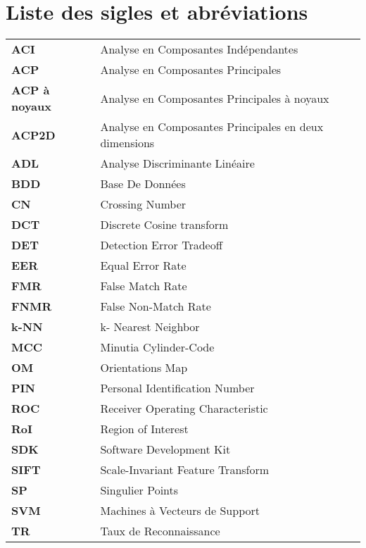 \chapter*{Liste des sigles et abréviations}%
\begin{table}[H]
	\label{my-label}
	\begin{tabular}{ll}
	    \textbf{ACI}  & Analyse en Composantes Indépendantes     \\
	    \textbf{ACP}  & Analyse en Composantes Principales     \\
	     \textbf{ACP à noyaux}  & Analyse en Composantes Principales à noyaux     \\
	    \textbf{ACP2D}  & Analyse en Composantes Principales en deux dimensions     \\
	    \textbf{ADL}  & Analyse Discriminante Linéaire     \\
	    \textbf{BDD}  & Base De Données    \\
		\textbf{CN}   & Crossing Number                          \\
	  \textbf{DCT}  & Discrete Cosine transform                 \\
		\textbf{DET}  & Detection Error Tradeoff                 \\
		\textbf{EER}  & Equal Error Rate                         \\
     	\textbf{FMR}  & False Match Rate                     \\
		\textbf{FNMR} & False Non-Match Rate                     \\
		\textbf{k-NN} & k- Nearest Neighbor                    \\
		\textbf{MCC}  & Minutia Cylinder-Code     \\
		\textbf{OM}   & Orientations Map                         \\
		\textbf{PIN}  & Personal Identification Number                \\
		\textbf{ROC}  & Receiver Operating Characteristic        \\
		\textbf{RoI}  & Region of Interest                       \\
		\textbf{SDK}  & Software Development Kit                 \\
	    \textbf{SIFT}  & Scale-Invariant Feature Transform                \\

		\textbf{SP}   & Singulier Points      \\       
		\textbf{SVM}  &  Machines à Vecteurs de Support     \\  
		\textbf{TR}  &  Taux de Reconnaissance                    \\  

	\end{tabular}
\end{table}